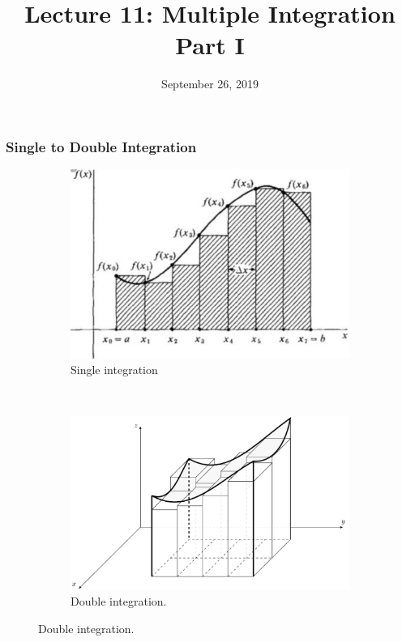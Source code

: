 \documentclass{beamer}
\title{Lecture 11: Multiple Integration Part I}
\date{September 26, 2019}
\begin{document}
	
\frame{\titlepage}

\begin{frame}
\frametitle{\textbf{Single to Double Integration}}
\begin{figure}
	\centering
	\begin{subfigure}{0.48\textwidth}
		
		\includegraphics[width=\textwidth]{IMG_0380.jpg}
		\hspace*{10pt}\hbox{}
		\caption{Single integration}
	\end{subfigure}%
	~ 
	\begin{subfigure}{0.48\textwidth}
	
		\includegraphics[width=\textwidth]{IMG_0385.jpg}
		\hspace*{10pt}\hbox{}
		\caption{Double integration.}
		\label{fig:2}
	\end{subfigure}
\end{figure}

\end{frame}
\end{document}
